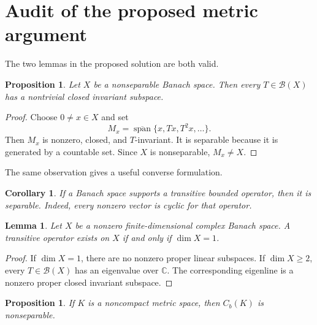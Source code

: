 \documentclass[11pt]{article}
\newtheorem{proposition}[theorem]{Proposition}
\newtheorem{lemma}[theorem]{Lemma}
\newtheorem{corollary}[theorem]{Corollary}
\theoremstyle{remark}
\newcommand{\Cb}{C_b}
\newcommand{\B}{\mathcal B}
\newcommand{\clspan}{\overline{\operatorname{span}}}
\newcommand{\C}{\mathbb C}
\begin{document}
\section{Audit of the proposed metric argument}\label{sec:audit}

The two lemmas in the proposed solution are both valid.

\begin{proposition}\label{prop:nonsep}
Let $X$ be a nonseparable Banach space.  Then every $T\in\B(X)$ has a
nontrivial closed invariant subspace.
\end{proposition}

\begin{proof}
Choose $0\neq x\in X$ and set
\[
  M_x=\clspan\{x,Tx,T^2x,\ldots\}.
\]
Then $M_x$ is nonzero, closed, and $T$-invariant.  It is separable because it
is generated by a countable set.  Since $X$ is nonseparable, $M_x\neq X$.
\end{proof}

The same observation gives a useful converse formulation.

\begin{corollary}\label{cor:transitive-separable}
If a Banach space supports a transitive bounded operator, then it is
separable.  Indeed, every nonzero vector is cyclic for that operator.
\end{corollary}

\begin{lemma}\label{lem:finite-dimensional}
Let $X$ be a nonzero finite-dimensional complex Banach space.  A transitive
operator exists on $X$ if and only if $\dim X=1$.
\end{lemma}

\begin{proof}
If $\dim X=1$, there are no nonzero proper linear subspaces.  If
$\dim X\geq2$, every $T\in\B(X)$ has an eigenvalue over $\C$.  The
corresponding eigenline is a nonzero proper closed invariant subspace.
\end{proof}

\begin{proposition}\label{prop:metric-noncompact}
If $K$ is a noncompact metric space, then $\Cb(K)$ is nonseparable.
\end{proposition}
\end{document}
